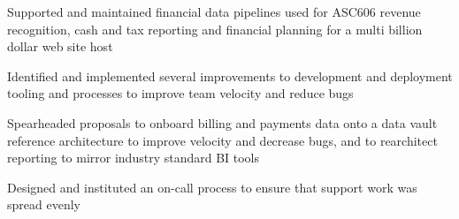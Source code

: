 \begin{job}

  \begin{accomplishments}
    \item Supported and maintained financial data pipelines used for ASC606
    revenue recognition, cash and tax reporting and financial planning for a
    multi billion dollar web site host
  \end{accomplishments}
  \begin{extendedaccomplishments}
    \item Identified and implemented several improvements to development and
    deployment tooling and processes to improve team velocity and reduce bugs
    \item Spearheaded proposals to onboard billing and payments data onto a data
    vault reference architecture to improve velocity and decrease bugs, and to
    rearchitect reporting to mirror industry standard BI tools
    \item Designed and instituted an on-call process to ensure that
    support work was spread evenly
  \end{extendedaccomplishments}
\end{job}
